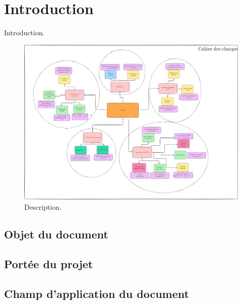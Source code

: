 \documentclass[a4paper,12pt]{report}  %
\begin{document}
		
	\tableofcontents
	
	\pagebreak
	
	\section{Introduction}
	Introduction.
	\lipsum[1] 
	
	\begin{figure}[h]
		\centering
		\includegraphics[width=\textwidth]{./attachements/Untitled-2025-06-11-1251_B.pdf}
		\caption{Description. }
		\label{fig:your_label}
	\end{figure}
	
	\subsection{Objet du document}
	\lipsum[2] 
	
	\subsection{Portée du projet}
	\lipsum[3]
	
	\subsection{Champ d'application du document}
	\lipsum[4]
	
\end{document}
